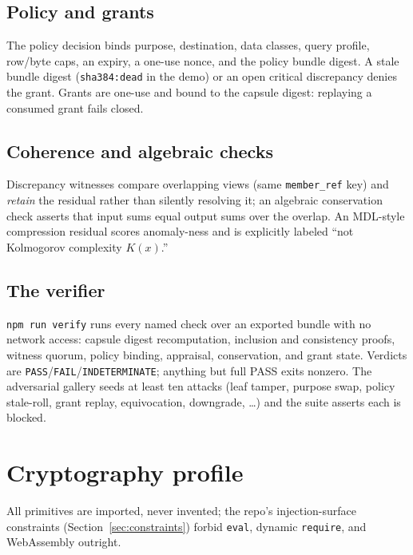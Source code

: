 \documentclass[11pt]{article}
\newcommand{\code}[1]{\texttt{#1}}
\begin{document}
\subsection{Policy and grants}
The policy decision binds purpose, destination, data classes, query profile,
row/byte caps, an expiry, a one-use nonce, and the policy bundle digest. A
stale bundle digest (\code{sha384:dead} in the demo) or an open critical
discrepancy denies the grant. Grants are one-use and bound to the capsule
digest: replaying a consumed grant fails closed.

\subsection{Coherence and algebraic checks}
Discrepancy witnesses compare overlapping views (same \code{member\_ref}
key) and \emph{retain} the residual rather than silently resolving it; an
algebraic conservation check asserts that input sums equal output sums over
the overlap. An MDL-style compression residual scores anomaly-ness and is
explicitly labeled ``not Kolmogorov complexity $K(x)$.''

\subsection{The verifier}
\code{npm run verify} runs every named check over an exported bundle with no
network access: capsule digest recomputation, inclusion and consistency
proofs, witness quorum, policy binding, appraisal, conservation, and grant
state. Verdicts are \code{PASS}/\code{FAIL}/\code{INDETERMINATE}; anything
but full PASS exits nonzero. The adversarial gallery seeds at least ten
attacks (leaf tamper, purpose swap, policy stale-roll, grant replay,
equivocation, downgrade, \ldots) and the suite asserts each is blocked.

\section{Cryptography profile}
\label{sec:crypto}

All primitives are imported, never invented; the repo's injection-surface
constraints (Section~\ref{sec:constraints}) forbid \code{eval}, dynamic
\code{require}, and WebAssembly outright.
\end{document}

